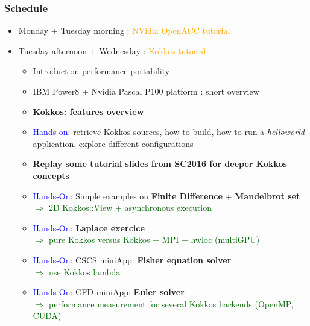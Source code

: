 \begin{frame}
  \frametitle{Schedule}

  \begin{itemize}
  \item Monday + Tuesday morning : \textcolor{orange}{NVidia OpenACC tutorial}
  \item Tuesday afternoon + Wednesday : \textcolor{orange}{Kokkos tutorial}
    \begin{itemize}
    \item Introduction performance portability
    \item IBM Power8 + Nvidia Pascal P100 platform : short overview
    \item \textbf{Kokkos: features overview}
    \item \textcolor{blue}{Hands-on:} retrieve Kokkos sources, how to build, how to run a \textit{helloworld} application, explore different configurations
    \item \textbf{Replay some tutorial slides from SC2016 for deeper Kokkos concepts}
    \item \textcolor{blue}{Hands-On:} Simple examples on \textbf{Finite Difference} +  \textbf{Mandelbrot set}\\
      \textcolor{darkgreen}{$\Rightarrow$ 2D Kokkos::View + asynchronous execution}
    \item \textcolor{blue}{Hands-On:} \textbf{Laplace exercice}\\
      \textcolor{darkgreen}{$\Rightarrow$ pure Kokkos versus Kokkos + MPI + hwloc (multiGPU)}
    \item \textcolor{blue}{Hands-On:} CSCS miniApp: \textbf{Fisher equation solver}\\
      \textcolor{darkgreen}{$\Rightarrow$ use Kokkos lambda}
    \item \textcolor{blue}{Hands-On:} CFD miniApp: \textbf{Euler solver}\\
      \textcolor{darkgreen}{$\Rightarrow$ performance measurement for several Kokkos backends (OpenMP, CUDA)}
    \end{itemize}
  \end{itemize}

\end{frame}